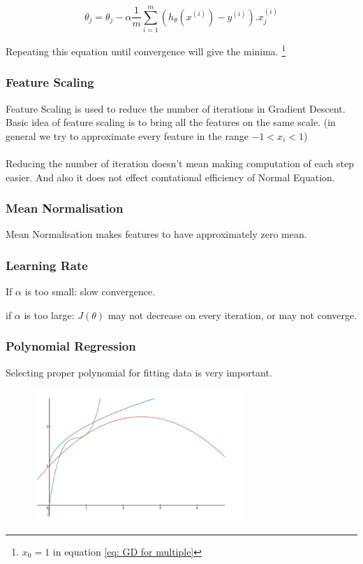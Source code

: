\documentclass[12pt]{report}
\begin{document}
    \begin{equation} \label {eq: GD for multiple}
      \theta_j =  \theta_j - \alpha \frac{1}{m} \sum_{i=1}^{m} (h_\theta(x^{(i)})-y^{(i)}).x_j^{(i)}
    \end{equation}

    Repeating this equation until convergence will give the minima. \footnote[1]{$x_0 = 1$ in equation \ref{eq: GD for multiple}}

  \subsubsection{Feature Scaling}
    Feature Scaling is used to reduce the number of iterations in Gradient Descent. Basic idea of feature scaling is to bring all the features on the same scale. (in general we try to approximate every feature in the range $ -1 < x_i < 1 $)
    \\ \\ Reducing the number of iteration doesn't mean making computation of each step easier. And also it does not effect comtational efficiency of Normal Equation.

  \subsubsection{Mean Normalisation}
    Mean Normalisation makes features to have approximately zero mean.

  \subsubsection{Learning Rate}
    If $\alpha$ is too small: slow convergence.

    if $\alpha$ is too large: $J(\theta)$ may not decrease on every iteration, or may not converge.

  \subsubsection{Polynomial Regression}
    Selecting proper polynomial for fitting data is very important.

    \begin{figure}[h]
      \centering
      \includegraphics[width=8cm, height=5cm]{polyreg.png}
    \end{figure}
\end{document}

